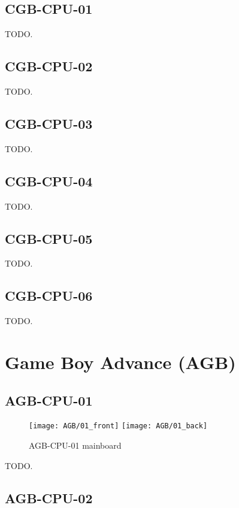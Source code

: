 \subsection{CGB-CPU-01}

TODO.

\subsection{CGB-CPU-02}

TODO.

\subsection{CGB-CPU-03}

TODO.

\subsection{CGB-CPU-04}

TODO.

\subsection{CGB-CPU-05}

TODO.

\subsection{CGB-CPU-06}

TODO.

\section{Game Boy Advance (AGB)}

\subsection{AGB-CPU-01}

\begin{figure}[H]
  \centering
  \texttt{[image: AGB/01\_front]}
  \texttt{[image: AGB/01\_back]}
  \caption{AGB-CPU-01 mainboard}
\end{figure}

TODO.

\subsection{AGB-CPU-02}

